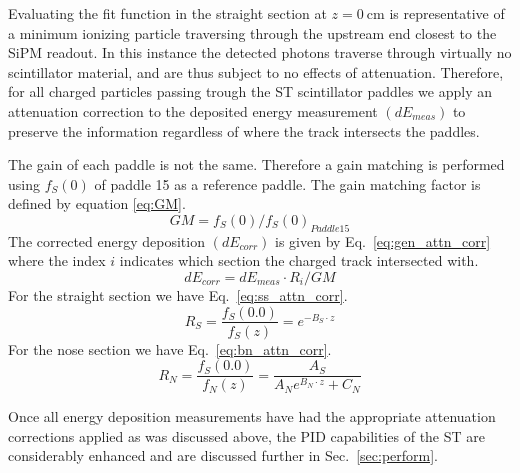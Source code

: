 Evaluating the fit function in the straight section at $z = 0\ \mathrm{cm}$ is representative of a minimum ionizing particle traversing through the upstream end closest to the SiPM readout.  In this instance the detected photons traverse through virtually no scintillator material, and are thus subject to no effects of attenuation.  Therefore, for all charged particles passing trough the ST scintillator paddles we apply an attenuation correction to the deposited energy measurement $(dE_{meas})$ to preserve the information regardless of where the track intersects the paddles.  

The gain of each paddle is not the same. Therefore a gain matching is performed using $f_{S}(0)$ of paddle 15 as a reference paddle. The gain matching factor is defined by equation 
 \ref{eq:GM}.
	\begin{equation} \label{eq:GM}
		GM = f_{S}(0)/f_{S}(0)_{Paddle 15}
	\end{equation}
	The corrected energy deposition $(dE_{corr})$ is given by Eq.~\ref{eq:gen_attn_corr} where the index $i$ indicates which section the charged track intersected with.
	\begin{equation} \label{eq:gen_attn_corr}
		dE_{corr} = dE_{meas} \cdot R_{i} /GM
	\end{equation}
For the straight section we have Eq.~\ref{eq:ss_attn_corr}.
	\begin{equation} \label{eq:ss_attn_corr}
		R_{S} = \frac{f_{S}(0.0)}{f_{S}(z)} = e^{-B_{S} \cdot z}
	\end{equation}
For the nose section we have Eq.~\ref{eq:bn_attn_corr}.
	\begin{equation} \label{eq:bn_attn_corr}
		R_{N} = \frac{f_{S}(0.0)}{f_{N}(z)} = \frac{A_{S}}{A_{N}e^{B_{N} \cdot z} + C_{N}}
	\end{equation}

Once all energy deposition measurements have had the appropriate attenuation corrections applied as was discussed above, the PID capabilities of the ST are considerably enhanced and are discussed further in Sec.~\ref{sec:perform}.